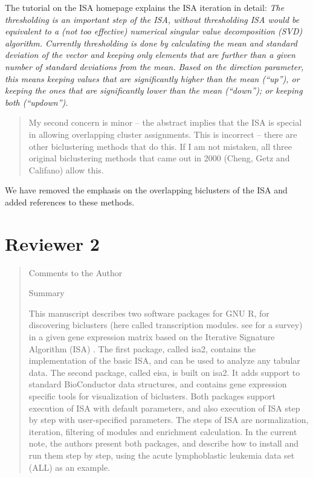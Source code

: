 \documentclass[a4paper]{article}
\begin{document}
The tutorial on the ISA homepage explains the ISA iteration in detail:
\textsl{The thresholding is an important step of the ISA, without
  thresholding ISA would be equivalent to a (not too eﬀective)
  numerical singular value decomposition (SVD) algorithm. Currently
  thresholding is done by calculating the mean and standard deviation
  of the vector and keeping only elements that are further than a
  given number of standard deviations from the mean. Based on the
  direction parameter, this means keeping values that are signiﬁcantly
  higher than the mean (``up''), or keeping the ones that are
  signiﬁcantly lower than the mean (``down''); or keeping both
  (``updown'').} 

\begin{quote}
My second concern is minor – the abstract implies that the ISA is
special in allowing overlapping cluster assignments. This is incorrect
– there are other biclustering methods that do this. If I am not
mistaken, all three original biclustering methods that came out in
2000 (Cheng, Getz and Califano) allow this. 
\end{quote}

We have removed the emphasis on the overlapping biclusters of the
ISA and added references to these methods.

\section{Reviewer 2}

\begin{quote}
Comments to the Author

Summary

This manuscript describes two software packages for GNU R, for
discovering biclusters (here called transcription modules. see \citet{tanay05} for
a survey) in a given gene expression matrix based on the Iterative
Signature Algorithm (ISA) \citep{isa}. The first package, called isa2,
contains the implementation of the basic ISA, and can be used to
analyze any tabular data. The second package, called eisa, is built on
isa2. It adds support to standard BioConductor \citep{BioC} data structures,
and contains gene expression specific tools for visualization of
biclusters. Both packages support execution of ISA with default
parameters, and also execution of ISA step by step with user-specified
parameters. The steps of ISA are normalization, iteration, filtering
of modules and enrichment calculation. In the current note, the
authors present both packages, and describe how to install and run
them step by step, using the acute lymphoblastic leukemia data set
(ALL) \citep{chiaretti04} as an example. 
\end{quote}
\end{document}
